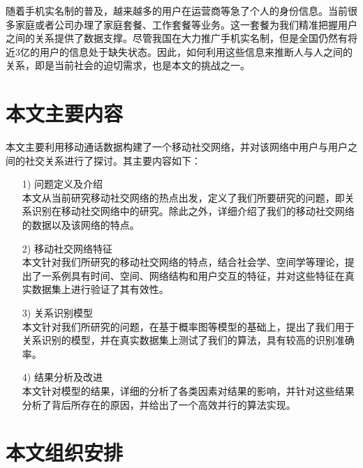 随着手机实名制的普及，越来越多的用户在运营商等急了个人的身份信息。当前很多家庭或者公司办理了家庭套餐、工作套餐等业务。这一套餐为我们精准把握用户之间的关系提供了数据支撑。尽管我国在大力推广手机实名制，但是全国仍然有将近3亿的用户的信息处于缺失状态。因此，如何利用这些信息来推断人与人之间的关系，即是当前社会的迫切需求，也是本文的挑战之一。


 




\section{本文主要内容}

本文主要利用移动通话数据构建了一个移动社交网络，并对该网络中用户与用户之间的社交关系进行了探讨。其主要内容如下：

\begin{enumerate}
\item[1)]问题定义及介绍 \\
本文从当前研究移动社交网络的热点出发，定义了我们所要研究的问题，即关系识别在移动社交网络中的研究。除此之外，详细介绍了我们的移动社交网络的数据以及该网络的特点。

\item[2)] 移动社交网络特征 \\
本文针对我们所研究的移动社交网络的特点，结合社会学、空间学等理论，提出了一系例具有时间、空间、网络结构和用户交互的特征，并对这些特征在真实数据集上进行验证了其有效性。

\item[3)] 关系识别模型 \\
本文针对我们所研究的问题，在基于概率图等模型的基础上，提出了我们用于关系识别的模型，并在真实数据集上测试了我们的算法，具有较高的识别准确率。

\item[4)] 结果分析及改进 \\
本文针对模型的结果，详细的分析了各类因素对结果的影响，并针对这些结果分析了背后所存在的原因，并给出了一个高效并行的算法实现。
\end{enumerate}



\section{本文组织安排}

